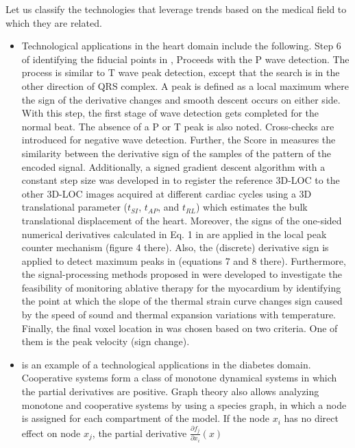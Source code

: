 \documentclass[11pt]{book}
\begin{document}
Let us classify the technologies that leverage trends based on the
medical field to which they are related.
\begin{itemize}
\item Technological applications in the heart domain include the following.
Step 6 of identifying the fiducial points in \cite{srikanth2002bottom},
Proceeds with the P wave detection. The process is similar to T wave
peak detection, except that the search is in the other direction of
QRS complex. A peak is defined as a local maximum where the sign of
the derivative changes and smooth descent occurs on either side. With
this step, the first stage of wave detection gets completed for the
normal beat. The absence of a P or T peak is also noted. Cross-checks
are introduced for negative wave detection. Further, the \textquotedbl Score\textquotedbl{}
in \cite{molina2013ecg}
measures the similarity between the derivative sign of the samples
of the pattern of the encoded signal. Additionally, a signed gradient
descent algorithm with a constant step size was developed in \cite{moghari2014three}
to register the reference 3D-LOC to the other 3D-LOC images acquired
at different cardiac cycles using a 3D translational parameter ($t_{SI}$,
$t_{AP}$, and $t_{RL}$) which estimates the bulk translational displacement
of the heart. Moreover, the signs of the one-sided numerical derivatives
calculated in Eq. 1 in \cite{soudani2018atrial}
are applied in the local peak counter mechanism (figure 4 there).
Also, the (discrete) derivative sign is applied to detect maximum
peaks in \cite{meddah2019fpga}
(equations 7 and 8 there). Furthermore, the signal-processing methods
proposed in \cite{seo2010monitoring}
were developed to investigate the feasibility of monitoring ablative
therapy for the myocardium by identifying the point at which the slope
of the thermal strain curve changes sign caused by the speed of sound
and thermal expansion variations with temperature. Finally, the final
voxel location in \cite{fyrdahl2020sector}
was chosen based on two criteria. One of them is the peak velocity
(sign change).
\item \cite{de2012prediction}
is an example of a technological applications in the diabetes domain.
Cooperative systems form a class of monotone dynamical systems in
which the partial derivatives are positive. Graph theory also allows
analyzing monotone and cooperative systems by using a species graph,
in which a node is assigned for each compartment of the model. If
the node $x_{i}$ has no direct effect on node $x_{j}$, the partial
derivative $\frac{\partial f_{j}}{\partial x_{i}}\left(x\right)$

\end{itemize}
\end{document}
